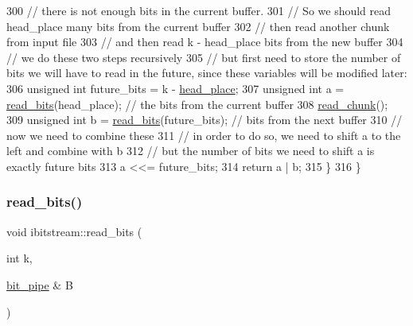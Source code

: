\begin{DoxyCode}
300     \textcolor{comment}{// there is not enough bits in the current buffer.}
301     \textcolor{comment}{// So we should read head\_place many bits from the current buffer}
302     \textcolor{comment}{// then read another chunk from input file}
303     \textcolor{comment}{// and then read k - head\_place bits from the new buffer}
304     \textcolor{comment}{// we do these two steps recursively}
305     \textcolor{comment}{// but first need to store the number of bits we will have to read in the future, since these variables
       will be modified later:}
306     \textcolor{keywordtype}{unsigned} \textcolor{keywordtype}{int} future\_bits = k - \hyperlink{classibitstream_a7b96359ac1534a5565e6e9b0cc53a0b3}{head\_place};
307     \textcolor{keywordtype}{unsigned} \textcolor{keywordtype}{int} a = \hyperlink{classibitstream_a2fdcaecf10fefa6942dcd5286a2696e0}{read\_bits}(head\_place); \textcolor{comment}{// the bits from the current buffer}
308     \hyperlink{classibitstream_ac62c26004436d83f337f4aeba0895e20}{read\_chunk}();
309     \textcolor{keywordtype}{unsigned} \textcolor{keywordtype}{int} b = \hyperlink{classibitstream_a2fdcaecf10fefa6942dcd5286a2696e0}{read\_bits}(future\_bits); \textcolor{comment}{// bits from the next buffer}
310     \textcolor{comment}{// now we need to combine these}
311     \textcolor{comment}{// in order to do so, we need to shift a to the left and combine with b}
312     \textcolor{comment}{// but the number of bits we need to shift a is exactly future bits}
313     a <<= future\_bits;
314     \textcolor{keywordflow}{return} a | b;
315   \}
316 \}
\end{DoxyCode}
\mbox{\label{classibitstream_a4bb7a698ab44c1e2fe21b4daa880bd6c}} 
\subsubsection{\texorpdfstring{read\+\_\+bits()}{read\_bits()}\hspace{0.1cm}{\footnotesize\ttfamily [2/2]}}
{\footnotesize\ttfamily void ibitstream\+::read\+\_\+bits (\begin{DoxyParamCaption}\item[{int}]{k,  }\item[{\hyperlink{classbit__pipe}{bit\+\_\+pipe} \&}]{B }\end{DoxyParamCaption})}



